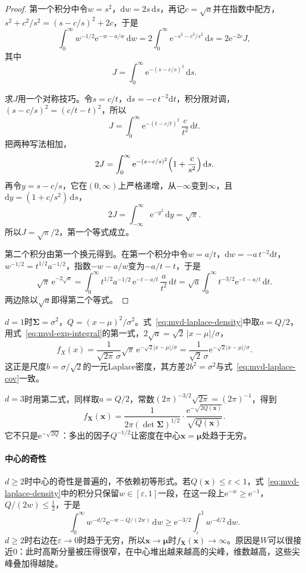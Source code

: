 \begin{proof}
第一个积分中令$w=s^{2}$，$\mathrm{d}w=2s\,\mathrm{d}s$，再记$c=\sqrt a$并在指数中配方，$s^{2}+c^{2}/s^{2}=(s-c/s)^{2}+2c$，于是
\[
 \int_0^{\infty}w^{-1/2}\mathrm{e}^{-w-a/w}\,\mathrm{d}w=2\int_0^{\infty}\mathrm{e}^{-s^{2}-c^{2}/s^{2}}\,\mathrm{d}s=2\mathrm{e}^{-2c}J,
\]
其中
\[
 J=\int_0^{\infty}\mathrm{e}^{-(s-c/s)^{2}}\,\mathrm{d}s .
\]

求$J$用一个对称技巧。令$s=c/t$，$\mathrm{d}s=-c\,t^{-2}\mathrm{d}t$，积分限对调，$(s-c/s)^{2}=(c/t-t)^{2}$，所以
\[
 J=\int_0^{\infty}\mathrm{e}^{-(t-c/t)^{2}}\,\frac{c}{t^{2}}\,\mathrm{d}t .
\]
把两种写法相加，
\[
 2J=\int_0^{\infty}\mathrm{e}^{-(s-c/s)^{2}}\Bigl(1+\frac{c}{s^{2}}\Bigr)\,\mathrm{d}s .
\]
再令$y=s-c/s$，它在$(0,\infty)$上严格递增，从$-\infty$变到$\infty$，且$\mathrm{d}y=(1+c/s^{2})\,\mathrm{d}s$，
\[
 2J=\int_{-\infty}^{\infty}\mathrm{e}^{-y^{2}}\,\mathrm{d}y=\sqrt\pi .
\]
所以$J=\sqrt\pi/2$，第一个等式成立。

第二个积分由第一个换元得到。在第一个积分中令$w=a/t$，$\mathrm{d}w=-a\,t^{-2}\mathrm{d}t$，$w^{-1/2}=t^{1/2}a^{-1/2}$，指数$-w-a/w$变为$-a/t-t$，于是
\[
 \sqrt\pi\,\mathrm{e}^{-2\sqrt a}=\int_0^{\infty}t^{1/2}a^{-1/2}\,\mathrm{e}^{-t-a/t}\,\frac{a}{t^{2}}\,\mathrm{d}t=\sqrt a\int_0^{\infty}t^{-3/2}\mathrm{e}^{-t-a/t}\,\mathrm{d}t .
\]
两边除以$\sqrt a$即得第二个等式。
\end{proof}

$d=1$时$\bm{\Sigma}=\sigma^{2}$，$Q=(x-\mu)^{2}/\sigma^{2}$。式~\eqref{eq:mvd-laplace-density}中取$a=Q/2$，用式~\eqref{eq:mvd-exp-integral}的第一式，$2\sqrt a=\sqrt2\,\lvert x-\mu\rvert/\sigma$，
\[
 f_X(x)=\frac{1}{\sqrt{2\pi}\,\sigma}\sqrt\pi\,\mathrm{e}^{-\sqrt2\lvert x-\mu\rvert/\sigma}=\frac{1}{\sqrt2\,\sigma}\mathrm{e}^{-\sqrt2\lvert x-\mu\rvert/\sigma} .
\]
这正是尺度$b=\sigma/\sqrt2$的一元Laplace密度，其方差$2b^{2}=\sigma^{2}$与式~\eqref{eq:mvd-laplace-cov}一致。

$d=3$时用第二式，同样取$a=Q/2$，常数$(2\pi)^{-3/2}\sqrt{2\pi}=(2\pi)^{-1}$，得到
\[
 f_{\bm{X}}(\bm{x})=\frac{1}{2\pi(\det\bm{\Sigma})^{1/2}}\cdot\frac{\mathrm{e}^{-\sqrt{2Q(\bm{x})}}}{\sqrt{Q(\bm{x})}} .
\]
它不只是$\mathrm{e}^{-\sqrt{2Q}}$：多出的因子$Q^{-1/2}$让密度在中心$\bm{x}=\bm{\mu}$处趋于无穷。

\paragraph{中心的奇性}
$d\geq2$时中心的奇性是普遍的，不依赖初等形式。若$Q(\bm{x})\leq\varepsilon<1$，式~\eqref{eq:mvd-laplace-density}中的积分只保留$w\in[\varepsilon,1]$一段，在这一段上$\mathrm{e}^{-w}\geq\mathrm{e}^{-1}$，$Q/(2w)\leq\tfrac12$，于是
\[
 \int_0^{\infty}w^{-d/2}\mathrm{e}^{-w-Q/(2w)}\,\mathrm{d}w\geq\mathrm{e}^{-3/2}\int_{\varepsilon}^{1}w^{-d/2}\,\mathrm{d}w .
\]
$d\geq2$时右边在$\varepsilon\to0$时趋于无穷，所以$\bm{x}\to\bm{\mu}$时$f_{\bm{X}}(\bm{x})\to\infty$。原因是$W$可以很接近$0$：此时高斯分量被压得很窄，在中心堆出越来越高的尖峰，维数越高，这些尖峰叠加得越陡。

